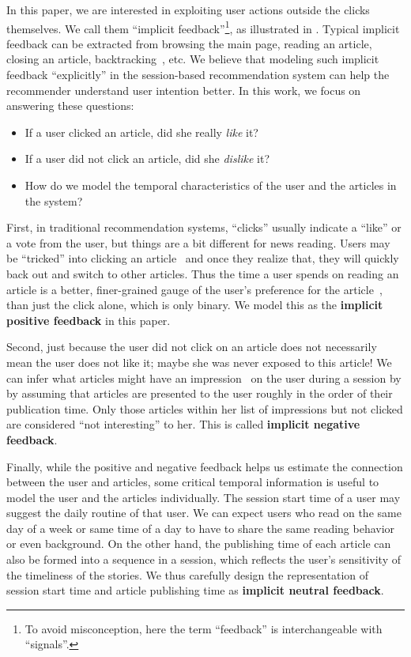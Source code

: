 In this paper, we are interested in exploiting user actions outside the 
clicks themselves. We call them ``implicit feedback''\footnote{To avoid misconception, here the term ``feedback'' is interchangeable with ``signals''.}, as
illustrated in . 
Typical implicit feedback can be extracted from browsing the main page, 
reading an article, closing an article, backtracking~\cite{smadja_understanding_2019}, 
etc. We believe that modeling such implicit feedback ``explicitly'' 
in the session-based recommendation system 
can help the recommender understand user intention better. 
In this work, we focus on answering these questions:
\begin{itemize}
    \item If a user clicked an article, did she really \textit{like} it? 
    \item If a user did not click an article, did she \textit{dislike} it?
    \item How do we model the temporal characteristics of the user and the articles in 
the system?
\end{itemize}

First, in traditional recommendation systems, ``clicks'' usually indicate a ``like'' or a
vote from the user, but things are a bit different for news reading. 
Users may be ``tricked'' into clicking an article~\cite{wang2020click} 
and once they realize that, they will quickly back out and switch to other articles. 
Thus the time a user spends on reading an article is a better, finer-grained 
gauge of the user's preference for the article~\cite{wu2020CPRS}, than 
just the click alone, which is only binary. We model this as the \textbf{implicit 
positive feedback} in this paper. 

Second, just because the user did not click on an article does not necessarily
mean the user does not like it; maybe she was never exposed to this article!  
We can infer what articles might have an impression~\cite{xie2020deep} on 
the user during a session by by assuming that articles are presented to the user 
roughly in the order of their publication time. 
Only those articles within her list of impressions but not clicked are considered
``not interesting'' to her. This is called \textbf{implicit negative feedback}.

Finally, while the positive and negative feedback helps us estimate the 
connection between the user and articles, 
some critical temporal information is useful to model
the user and the articles individually. 
The session start time of a user may suggest
the daily routine of that user. We can expect users who read on
the same day of a week or same time of a day to have to
share the same reading behavior or even background.
On the other hand, the publishing time of each article can also be
formed into a sequence in a session, which reflects the user's sensitivity of 
the timeliness of the stories. We thus carefully design the representation of
session start time and article publishing time as 
\textbf{implicit neutral feedback}.


